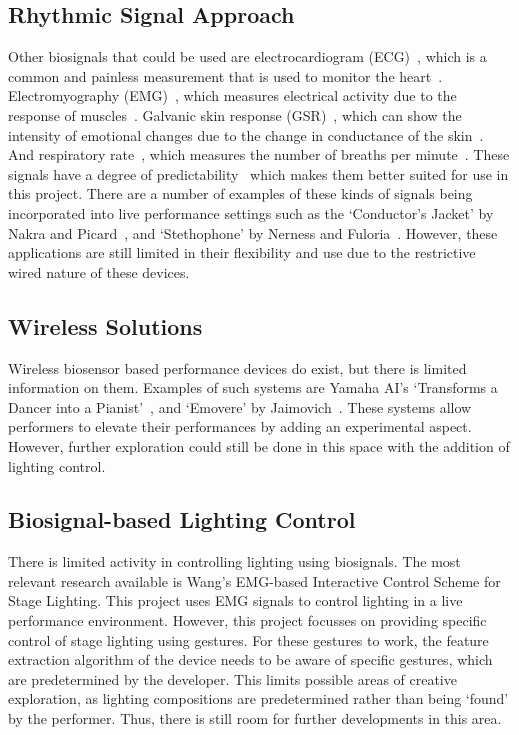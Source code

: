 \subsection{Rhythmic Signal Approach}
Other biosignals that could be used are electrocardiogram (ECG)~\cite{Afonso:1999}\cite{Pan:1985},
which is a common and painless measurement that is used to monitor the heart~\cite{Mayo:2023}.
Electromyography (EMG)~\cite{Tanaka:2002}\cite{Young:2013},
which measures electrical activity due to the response of muscles~\cite{Hopkins:2023}.
Galvanic skin response (GSR)~\cite{Kurniawan:2013},
which can show the intensity of emotional changes due to the change in conductance of the skin~\cite{Farnsworth:2018}.
And respiratory rate~\cite{Carlos:2011},
which measures the number of breaths per minute~\cite{Hopkins2:2023}.
These signals have a degree of predictability~\cite{Tahiroğlu:2008} which makes them better suited for use in this project.
There are a number of examples of these kinds of signals being incorporated into live performance settings such as
the `Conductor's Jacket' by Nakra and Picard~\cite{Nakra:1998}, and `Stethophone' by Nerness and Fuloria~\cite{Nerness:2019}.
However, these applications are still limited in their flexibility and use due to the restrictive wired nature of these devices.

\subsection{Wireless Solutions}
Wireless biosensor based performance devices do exist, but there is limited information on them.
Examples of such systems are Yamaha AI's `Transforms a Dancer into a Pianist'~\cite{Yamaha:2018}, and `Emovere' by Jaimovich~\cite{Jaimovich:2016}.
These systems allow performers to elevate their performances by adding an experimental aspect.
However, further exploration could still be done in this space with the addition of lighting control.

\subsection{Biosignal-based Lighting Control}
There is limited activity in controlling lighting using biosignals.
The most relevant research available is Wang's EMG-based Interactive Control Scheme for Stage Lighting\cite{Wang:2022}.
This project uses EMG signals to control lighting in a live performance environment.
However, this project focusses on providing specific control of stage lighting using gestures.
For these gestures to work, the feature extraction algorithm of the device needs to be aware of specific gestures, which are predetermined by the developer.
This limits possible areas of creative exploration, as lighting compositions are predetermined rather than being `found' by the performer.
Thus, there is still room for further developments in this area.

